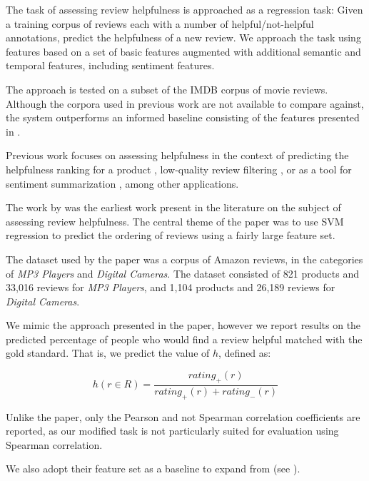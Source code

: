 \documentclass[letter,10pt]{article}
\begin{document}
The task of assessing review helpfulness is approached as a regression task:
Given a training corpus of reviews each with a number of helpful/not-helpful
	annotations, predict the helpfulness of a new review.
We approach the task using features based on a set of basic features augmented
	with additional semantic and temporal features, including sentiment
	features.

The approach is tested on a subset of the IMDB corpus of movie reviews.
Although the corpora used in previous work are not available
	to compare against, the system outperforms an informed baseline consisting
	of the features presented in .


Previous work focuses on assessing helpfulness in the context of
	predicting the helpfulness ranking for a product \cite{2006kim-helpfulness},
	low-quality review filtering \cite{2007liu-helpfulness}, or
	as a tool for sentiment summarization \cite{2008titov-summarization},
	among other applications.

The work by  was the earliest work present 
	in the literature on the subject of assessing review helpfulness.
The central theme of the paper was to use SVM regression to predict the
	ordering of reviews using a fairly large feature set.

The dataset used by the paper was a corpus of Amazon reviews, in the categories
	of {\em MP3 Players} and {\em Digital Cameras}.
The dataset consisted of 821 products and 33,016 reviews for {\em MP3 Players},
	and 1,104 products and 26,189 reviews for {\em Digital Cameras}.

We mimic the approach presented in the paper, 
	however we report results on the predicted percentage
	of people who would find a review helpful matched with the gold standard.
That is, we predict the value of $h$, defined as:

\begin{equation}
	h(r \in R) = \frac{rating_+(r)}{rating_+(r)+rating_-(r)}
\end{equation}

Unlike the paper, only the Pearson and not Spearman correlation coefficients
	are reported, as our modified task is not particularly suited for
	evaluation using Spearman correlation.

We also adopt their feature set as a baseline to expand from (see
	).
\end{document}
